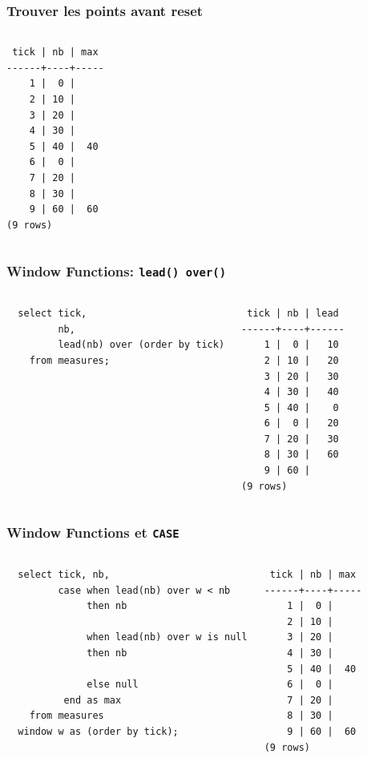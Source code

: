 \documentclass{beamer}
\begin{document}
\begin{frame}[fragile]
  \frametitle{Trouver les points avant reset}

\begin{columns}
\begin{verbatim}
 tick | nb | max 
------+----+-----
    1 |  0 |    
    2 | 10 |    
    3 | 20 |    
    4 | 30 |    
    5 | 40 |  40
    6 |  0 |    
    7 | 20 |    
    8 | 30 |    
    9 | 60 |  60
(9 rows)
\end{verbatim}
\end{columns}
\end{frame}

\begin{frame}[fragile]
  \frametitle{Window Functions: \texttt{lead() over()}}

\begin{columns}
\begin{verbatim}
  select tick,
         nb,
         lead(nb) over (order by tick)
    from measures;
\end{verbatim}

\begin{verbatim}
 tick | nb | lead 
------+----+------
    1 |  0 |   10
    2 | 10 |   20
    3 | 20 |   30
    4 | 30 |   40
    5 | 40 |    0
    6 |  0 |   20
    7 | 20 |   30
    8 | 30 |   60
    9 | 60 |     
(9 rows)
\end{verbatim}
\end{columns}
\end{frame}

\begin{frame}[fragile]
  \frametitle{Window Functions et \texttt{CASE}}

\begin{columns}
\begin{verbatim}
  select tick, nb,
         case when lead(nb) over w < nb
              then nb

              when lead(nb) over w is null
              then nb

              else null
          end as max
    from measures
  window w as (order by tick);
\end{verbatim}
\begin{verbatim}
 tick | nb | max 
------+----+-----
    1 |  0 |    
    2 | 10 |    
    3 | 20 |    
    4 | 30 |    
    5 | 40 |  40
    6 |  0 |    
    7 | 20 |    
    8 | 30 |    
    9 | 60 |  60
(9 rows)
\end{verbatim}
\end{columns}
\end{frame}
\end{document}
